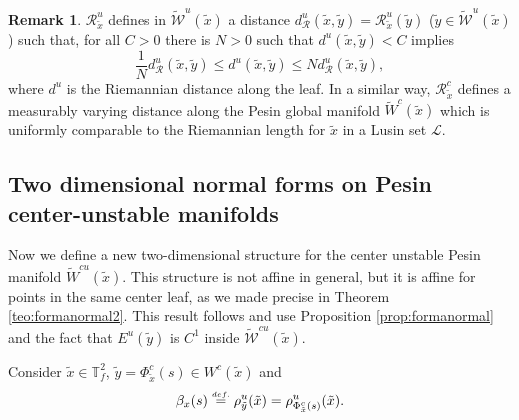 \documentclass[a4paper,11pt,reqno]{amsart}
\def\tW{\widetilde W}
\newcommand{\cL}{{\mathcal L}}
\newcommand{\cW}{{\mathcal W}}
\newcommand{\cR}{{\mathcal R}}
\newcommand{\eqdef}{\stackrel{\scriptscriptstyle\textrm def.}{=}}
\newcommand{\tix}{\tilde{x}}
\newcommand{\w}{\widetilde{\cW}}
\theoremstyle{definition}
\newtheorem{remark}{Remark}
\begin{document}
\begin{remark}
    \label{rem:R-dist}
    $\mathcal{R}^u_{\tix}$ defines in $\w^u(\tix)$ a distance $d^u_{\mathcal{R}}(\tix, \tilde{y}) = \mathcal{R}^u_{\tix} (\tilde{y})$ ($\tilde{y} \in \w^u(\tix)$) such that, for all $C > 0$ there is $N > 0$ such that $d^u(\tilde{x}, \tilde{y}) < C$ implies
    $$\dfrac{1}{N} d^u_{\mathcal{R}}(\tix, \tilde{y}) \leq d^u(\tilde{x}, \tilde{y}) \leq N d^{u}_{\mathcal{R}}(\tix, \tilde{y}),$$
    where $d^u$ is the Riemannian distance along the leaf. In a similar way, $\cR^c_{\tix}$ defines a measurably varying distance along the Pesin global manifold $\tW^c(\tix)$ which is uniformly comparable to the Riemannian length for $\tix$ in a Lusin set $\cL$.
\end{remark}

\subsection{Two dimensional normal forms on Pesin center-unstable manifolds}

Now we define a new two-dimensional structure for the center unstable Pesin manifold $\tW^{cu}(\tix)$. This structure is not affine in general, but it is affine for points in the same center leaf, as we made precise in Theorem \ref{teo:formanormal2}. This result follows \cite{ALOS} and use Proposition \ref{prop:formanormal} and the fact that $E^u(\tilde{y})$ is $C^1$ inside $\w^{cu}(\tix)$.

Consider $\tix \in \mathbb{T}^2_f$, $\tilde{y} = \Phi^c_{\tix}(s) \in W^{c}(\tix)$ and
\begin{equation}
    \label{eq:beta}
    \beta_x(s) \eqdef \rho^u_{\tilde{y}}(\tix) =  \rho^u_{\Phi^c_{\tix}(s)}(\tix).
\end{equation}
\end{document}
